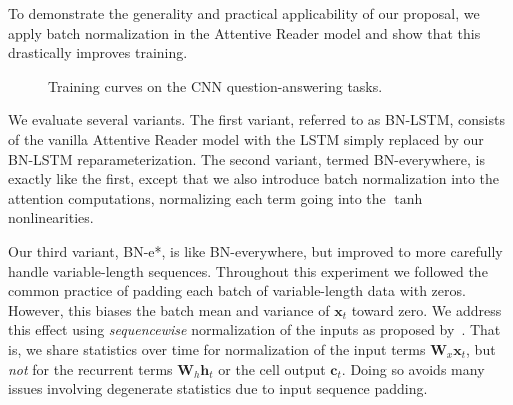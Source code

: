 \documentclass{article} %
\newcommand{\vect}[1]{\mathbf{#1}}
\newcommand{\mat}[1]{\mathbf{#1}}
\begin{document}
To demonstrate the generality and practical applicability of our proposal,
we apply batch normalization in the Attentive Reader model
and show that this drastically improves training.

\begin{figure}[!ht]
  \center%
  \hspace{2mm}%
  \caption{Training curves on the CNN question-answering tasks.}
  \label{fig:attr2}
\end{figure}

We evaluate several variants.  The first variant, referred to as BN-LSTM,
consists of the vanilla Attentive Reader model with the LSTM simply replaced by
our BN-LSTM reparameterization.  The second variant, termed BN-everywhere, is
exactly like the first, except that we also introduce batch normalization into
the attention computations, normalizing each term going into the $\tanh$
nonlinearities.

Our third variant, BN-e*, is like BN-everywhere, but improved to more carefully
handle variable-length sequences.  Throughout this experiment we followed the
common practice of padding each batch of variable-length data with zeros.
However, this biases the batch mean and variance of $\vect{x}_t$ toward zero.
We address this effect using \emph{sequencewise} normalization of the inputs as
proposed by~\citet{cesar,baidu}.  That is, we share statistics over time for
normalization of the input terms $\mat{W}_x \vect{x}_t$, but \emph{not} for the
recurrent terms $\mat{W}_h \vect{h}_t$ or the cell output $\vect{c}_t$.  Doing
so avoids many issues involving degenerate statistics due to input sequence
padding.
\end{document}
